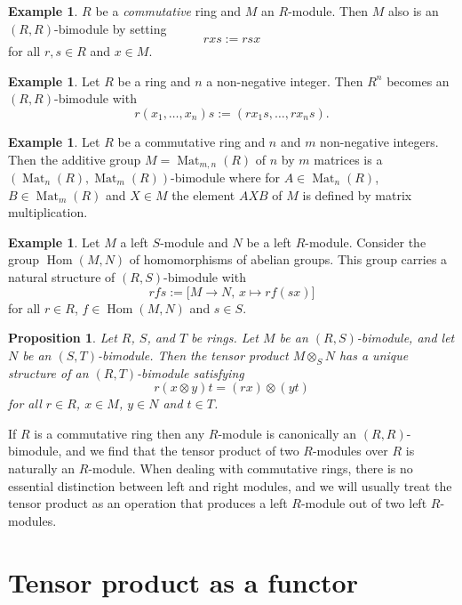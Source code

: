 \documentclass[11pt]{amsbook}
\DeclareMathOperator\Hom{Hom}
\DeclareMathOperator\Mat{Mat}
\theoremstyle{plain}
\newtheorem{proposition}[theorem]{Proposition}
\theoremstyle{definition}
\newtheorem{example}[theorem]{Example}
\begin{document}
\begin{example}$R$ be a \emph{commutative} ring and $M$ an $R$-module. Then $M$ also is an $(R,R)$-bimodule by setting
\[
	rxs := rsx
\]
for all $r,s\in R$ and $x\in M$.
\end{example}

\begin{example}\label{exa:Rn-bimodule}
Let $R$ be a ring and $n$ a non-negative integer. Then $R^n$ becomes an $(R,R)$-bimodule with
\[
	r(x_1,\ldots, x_n)s := (rx_1s, \ldots, rx_ns).
\]
\end{example}

\begin{example}Let $R$ be a commutative ring and $n$ and $m$ non-negative integers. Then the additive group $M=\Mat_{m,n}(R)$ of $n$ by $m$ matrices is a $(\Mat_n(R),\Mat_m(R))$-bimodule where for $A\in \Mat_{n}(R)$, $B\in \Mat_{m}(R)$ and $X\in M$ the element $AXB$ of $M$ is defined by matrix multiplication.
\end{example}


\begin{example}\label{exa:Hom-bimodule}
Let $M$ a left $S$-module and $N$ be a left $R$-module. Consider the group $\Hom(M,N)$ of homomorphisms of abelian groups. This group carries a natural structure of $(R,S)$-bimodule with
\[
	rfs := \big[ M \to N,\, x \mapsto rf(sx) \big]
\] 
for all $r\in R$, $f\in \Hom(M,N)$ and $s\in S$.
\end{example}

\begin{proposition}
Let $R$, $S$, and $T$ be rings. Let $M$ be an $(R,S)$-bimodule, and let $N$ be an $(S,T)$-bimodule. Then the tensor product $M\otimes_S N$ has a unique structure of an $(R,T)$-bimodule satisfying
\[
	r(x\otimes y)t = (rx) \otimes (yt)
\]
for all $r\in R$, $x\in M$, $y\in N$ and  $t\in T$. 
\end{proposition}

If $R$ is a commutative ring then any $R$-module is canonically an $(R,R)$-bimodule, and we find that
the tensor product of two $R$-modules over $R$ is naturally an $R$-module. When dealing with commutative rings, there is no essential distinction between left and right modules, and we will usually treat the tensor product as an operation that produces a left $R$-module out of two left $R$-modules.





\section{Tensor product as a functor}
\end{document}
